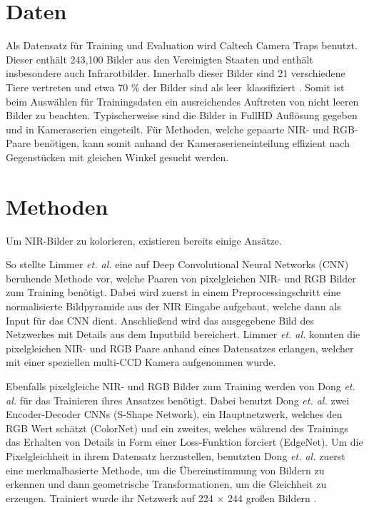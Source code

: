\documentclass[runningheads]{llncs}
\begin{document}
\section{Daten}
Als Datensatz für Training und Evaluation wird Caltech Camera Traps \cite*{caltech} benutzt. 
Dieser enthält 243,100 Bilder aus den Vereinigten Staaten und enthält insbesondere auch Infrarotbilder.
Innerhalb dieser Bilder sind 21 verschiedene Tiere vertreten und etwa 70 \% der Bilder sind als \glqq leer\grqq \ klassifiziert \cite*{caltech}.
Somit ist beim Auswählen für Trainingsdaten ein ausreichendes Auftreten von nicht leeren Bilder zu beachten.  
Typischerweise sind die Bilder in FullHD Auflösung gegeben und in Kameraserien eingeteilt. 
Für Methoden, welche gepaarte NIR- und RGB-Paare benötigen, kann somit anhand der Kameraserieneinteilung effizient nach Gegenstücken mit gleichen Winkel gesucht werden.  

\section{Methoden}
Um NIR-Bilder zu kolorieren, existieren bereits einige Ansätze. 

So stellte Limmer \textit{et. al.} eine auf Deep Convolutional Neural Networks (CNN) beruhende Methode vor, 
welche Paaren von pixelgleichen NIR- und RGB Bilder zum Training benötigt. Dabei wird zuerst in einem Preprocessingschritt eine normalisierte Bildpyramide
aus der NIR Eingabe aufgebaut, welche dann als Input für das CNN dient. Anschließend wird das ausgegebene Bild des Netzwerkes mit Details aus dem Inputbild bereichert.
Limmer \textit{et. al.} konnten die pixelgleichen NIR- und RGB Paare anhand eines Datensatzes erlangen, welcher mit einer speziellen multi-CCD Kamera aufgenommen wurde. \cite{limmer2016infrared}   

Ebenfalls pixelgleiche NIR- und RGB Bilder zum Training werden von Dong \textit{et. al.} für das Trainieren ihres Ansatzes benötigt. 
Dabei benutzt Dong \textit{et. al.} zwei Encoder-Decoder CNNs (\glqq S-Shape Network\grqq), ein Hauptnetzwerk, welches den RGB Wert schätzt (\glqq ColorNet\grqq) und ein zweites, 
welches während des Trainings das Erhalten von Details in Form einer Loss-Funktion forciert (\glqq EdgeNet\grqq). 
Um die Pixelgleichheit in ihrem Datensatz herzustellen, 
benutzten Dong \textit{et. al.} zuerst eine merkmalbasierte Methode, um die Übereinstimmung von Bildern zu erkennen 
und dann geometrische Transformationen, um die Gleichheit zu erzeugen.    
Trainiert wurde ihr Netzwerk auf 224 $\times$ 244 großen Bildern \cite{dong2018infrared}.
\end{document}
